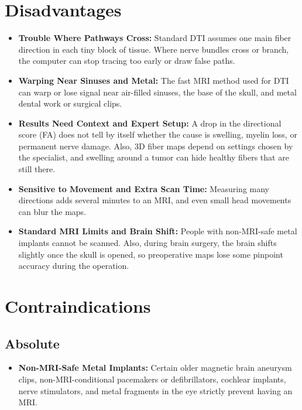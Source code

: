 \section{Disadvantages}

\begin{itemize}
    \item \textbf{Trouble Where Pathways Cross:} Standard DTI assumes one main fiber direction in each tiny block of tissue. Where nerve bundles cross or branch, the computer can stop tracing too early or draw false paths.
    \item \textbf{Warping Near Sinuses and Metal:} The fast MRI method used for DTI can warp or lose signal near air-filled sinuses, the base of the skull, and metal dental work or surgical clips.
    \item \textbf{Results Need Context and Expert Setup:} A drop in the directional score (FA) does not tell by itself whether the cause is swelling, myelin loss, or permanent nerve damage. Also, 3D fiber maps depend on settings chosen by the specialist, and swelling around a tumor can hide healthy fibers that are still there.
    \item \textbf{Sensitive to Movement and Extra Scan Time:} Measuring many directions adds several minutes to an MRI, and even small head movements can blur the maps.
    \item \textbf{Standard MRI Limits and Brain Shift:} People with non-MRI-safe metal implants cannot be scanned. Also, during brain surgery, the brain shifts slightly once the skull is opened, so preoperative maps lose some pinpoint accuracy during the operation.
\end{itemize}

\section{Contraindications}

\subsection{Absolute}

\begin{itemize}
    \item \textbf{Non-MRI-Safe Metal Implants:} Certain older magnetic brain aneurysm clips, non-MRI-conditional pacemakers or defibrillators, cochlear implants, nerve stimulators, and metal fragments in the eye strictly prevent having an MRI.
\end{itemize}

